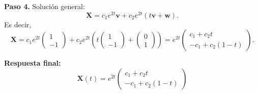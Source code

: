 \begin{example}
\begin{myproof}
\textbf{Paso 4.} Solución general:
\[
\mathbf{X}=c_1 e^{2t}\mathbf{v}+c_2 e^{2t}(t\mathbf{v}+\mathbf{w}).
\]
Es decir,
\[
\mathbf{X}=c_1 e^{2t}
\begin{pmatrix}
1\\-1
\end{pmatrix}
+c_2 e^{2t}
\left(
t
\begin{pmatrix}
1\\-1
\end{pmatrix}
+
\begin{pmatrix}
0\\1
\end{pmatrix}
\right)
=
e^{2t}
\begin{pmatrix}
c_1+c_2 t\\
-c_1+c_2(1-t)
\end{pmatrix}.
\]

\textbf{Respuesta final:}
\[
\boxed{
\mathbf{X}(t)=e^{2t}
\begin{pmatrix}
c_1+c_2 t\\
-c_1+c_2(1-t)
\end{pmatrix}
}
\]
\end{myproof}
\end{example}


